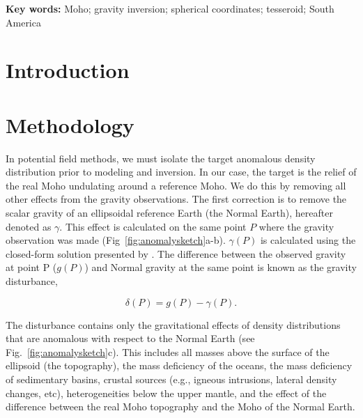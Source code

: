 \documentclass[extra]{gji}
\title[]{\Title}
\author[]{
    Leonardo Uieda$^{1,2}$,
    Valéria C. F. Barbosa$^{2}$
    \\
    $^1$Universidade do Estado do Rio de Janeiro, Rio de Janeiro, Brazil.
    e-mail: leouieda@gmail.com
    \\
    $^2$Observatório Nacional, Rio de Janeiro, Brazil.
}
\newcommand{\Keywords}{
        Moho;
        gravity inversion;
        spherical coordinates;
        tesseroid;
        South America
}
\begin{document}
\maketitle


\begin{abstract}
\end{abstract}

\noindent\textbf{Key words:} \Keywords


\section{Introduction}


\section{Methodology}


In potential field methods,
we must isolate the target anomalous density distribution prior to modeling and
inversion.
In our case, the target is the relief of the real Moho undulating around a
reference Moho.
We do this by removing all other effects from the gravity observations.
The first correction is to remove the
scalar gravity of an ellipsoidal reference Earth (the Normal Earth),
hereafter denoted as $\gamma$.
This effect is calculated on the same point $P$ where
the gravity observation was made
(Fig~\ref{fig:anomalysketch}a-b).
$\gamma(P)$ is calculated using
the closed-form solution presented by \citet{li2001}.
The difference between the observed gravity at point P ($g(P)$)
and Normal gravity at the same point
is known as the gravity disturbance,

\begin{equation}
    \delta(P) = g(P) - \gamma(P).
    \label{eq:disturbance}
\end{equation}

The disturbance contains only the gravitational effects of density
distributions that are anomalous with respect to the Normal Earth
(see Fig.~\ref{fig:anomalysketch}c).
This includes all masses above the surface of the ellipsoid (the topography),
the mass deficiency of the oceans,
the mass deficiency of sedimentary basins,
crustal sources (e.g., igneous intrusions, lateral density changes, etc),
heterogeneities below the upper mantle,
and the effect of the difference between the real Moho
topography and the Moho of the Normal Earth.
\end{document}
